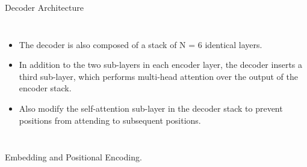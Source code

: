 \documentclass{beamer}
\begin{document}
\begin{frame}{Decoder Architecture}
\begin{columns}
  \begin{itemize}
      \item The decoder is also composed of a stack of N = 6 identical layers.
      \item In addition to the two sub-layers in each encoder layer, the decoder inserts a third sub-layer, which performs multi-head attention over the output of the encoder stack.
      \item Also modify the self-attention sub-layer in the decoder stack to prevent positions from attending to subsequent positions. 

  \end{itemize}
\end{columns}
\end{frame}

\begin{frame}{Embedding and Positional Encoding.}


\end{frame}
\end{document}
